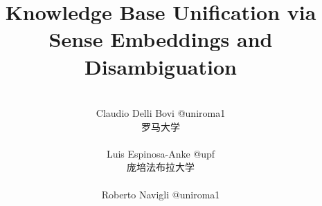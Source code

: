 \documentclass[xcolor=svgnames,dvipsnames,table, hyperref=pdftex, mathserif, presentation]{beamer}
\begin{document}
 
\title[2015春总结]{Knowledge Base Unification via Sense Embeddings and Disambiguation}

\author[Zhe Han]{\\ 
Claudio Delli Bovi @uniroma1 \begin{footnotesize}罗马大学\end{footnotesize}\\
Luis Espinosa-Anke @upf \begin{footnotesize}庞培法布拉大学\end{footnotesize}\\
Roberto Navigli @uniroma1\\
}

\frame[t,plain]{ \titlepage } %

\end{document}
